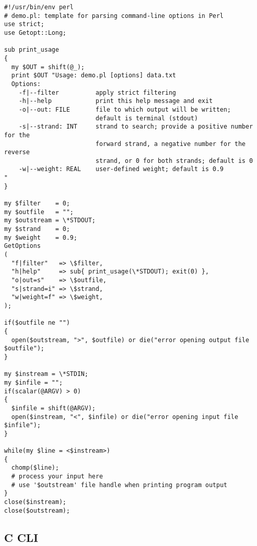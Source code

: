 \documentclass{article}
\begin{document}
\begin{verbatim}
#!/usr/bin/env perl
# demo.pl: template for parsing command-line options in Perl
use strict;
use Getopt::Long;

sub print_usage
{
  my $OUT = shift(@_);
  print $OUT "Usage: demo.pl [options] data.txt
  Options:
    -f|--filter          apply strict filtering
    -h|--help            print this help message and exit
    -o|--out: FILE       file to which output will be written;
                         default is terminal (stdout)
    -s|--strand: INT     strand to search; provide a positive number for the
                         forward strand, a negative number for the reverse
                         strand, or 0 for both strands; default is 0
    -w|--weight: REAL    user-defined weight; default is 0.9
"
}

my $filter    = 0;
my $outfile   = "";
my $outstream = \*STDOUT;
my $strand    = 0;
my $weight    = 0.9;
GetOptions
(
  "f|filter"   => \$filter,
  "h|help"     => sub{ print_usage(\*STDOUT); exit(0) },
  "o|out=s"    => \$outfile,
  "s|strand=i" => \$strand,
  "w|weight=f" => \$weight,
);

if($outfile ne "")
{
  open($outstream, ">", $outfile) or die("error opening output file $outfile");
}

my $instream = \*STDIN;
my $infile = "";
if(scalar(@ARGV) > 0)
{
  $infile = shift(@ARGV);
  open($instream, "<", $infile) or die("error opening input file $infile");
}

while(my $line = <$instream>)
{
  chomp($line);
  # process your input here
  # use '$outstream' file handle when printing program output
}
close($instream);
close($outstream);
\end{verbatim}

\subsection{C CLI}
\end{document}

